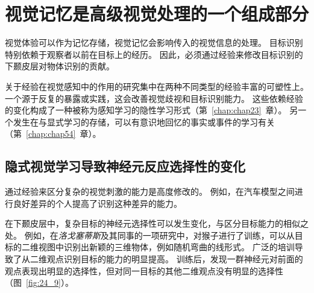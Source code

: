 \section{视觉记忆是高级视觉处理的一个组成部分}

视觉体验可以作为记忆存储，视觉记忆会影响传入的视觉信息的处理。
目标识别特别依赖于观察者以前在目标上的经历。
因此，必须通过经验来修改目标识别的下颞皮层对物体识别的贡献。


关于经验在视觉感知中的作用的研究集中在两种不同类型的经验丰富的可塑性上。
一个源于反复的暴露或实践，这会改善视觉歧视和目标识别能力。
这些依赖经验的变化构成了一种被称为感知学习的隐性学习形式（第~\ref{chap:chap23}~章）。
另一个发生在与显式学习的存储，可以有意识地回忆的事实或事件的学习有关（第~\ref{chap:chap54}~章）。



\subsection{隐式视觉学习导致神经元反应选择性的变化}

通过经验来区分复杂的视觉刺激的能力是高度修改的。
例如，在汽车模型之间进行良好差异的个人提高了识别这种差异的能力。


在下颞皮层中，复杂目标的神经元选择性可以发生变化，与区分目标能力的相似之处。
例如，在\textit{洛戈塞蒂斯}及其同事的一项研究中，对猴子进行了训练，可以从目标的二维视图中识别出新颖的三维物体，例如随机弯曲的线形式。
广泛的培训导致了从二维观点识别目标的能力的明显提高。
训练后，发现一群神经元对前面的观点表现出明显的选择性，但对同一目标的其他二维观点没有明显的选择性（图~\ref{fig:24_9}）。


